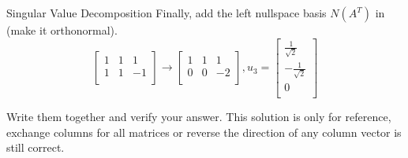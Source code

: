 \documentclass{beamer}
\begin{document}
\begin{frame}{Singular Value Decomposition}
Finally, add the left nullspace basis $N(A^T)$ in (make it orthonormal).
\begin{equation*}
    \left[ \begin{matrix}
        1&		1&		1\\
        1&		1&		-1\\
    \end{matrix} \right] \rightarrow \left[ \begin{matrix}
        1&		1&		1\\
        0&		0&		-2\\
    \end{matrix} \right], u_3=\left[ \begin{array}{c}
        \frac{1}{\sqrt{2}}\\
        -\frac{1}{\sqrt{2}}\\
        0\\
    \end{array} \right]
\end{equation*}

Write them together and verify your answer. This solution is only for reference, exchange columns for all matrices or reverse the direction of any column vector is still correct.
\end{frame}
\end{document}
